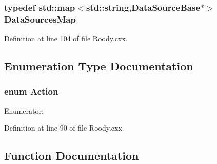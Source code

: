\subsubsection[{DataSourcesMap}]{\setlength{\rightskip}{0pt plus 5cm}typedef std::map$<$std::string,DataSourceBase$\ast$$>$ {\bf DataSourcesMap}}\label{Roody_8cxx_a983be03604153205d83c4c28d8b2891e}


Definition at line 104 of file Roody.cxx.

\subsection{Enumeration Type Documentation}
\subsubsection[{Action}]{\setlength{\rightskip}{0pt plus 5cm}enum {\bf Action}}\label{Roody_8cxx_a8bb1ef53467e4f61410d12822d922498}
\begin{Desc}
\item[Enumerator: ]\par
\begin{description}
\item[{\em 
A\_\-ITEM\label{Roody_8cxx_a8bb1ef53467e4f61410d12822d922498ad4f8562da213e20133393364451c5b44}
}]\item[{\em 
A\_\-FOLDER\label{Roody_8cxx_a8bb1ef53467e4f61410d12822d922498a506cbac1e552dac39438f1257f0a48db}
}]\item[{\em 
A\_\-SOURCE\label{Roody_8cxx_a8bb1ef53467e4f61410d12822d922498a2c9efb4d17b30eba2326dab6d8763d1a}
}]\item[{\em 
A\_\-GROUP\label{Roody_8cxx_a8bb1ef53467e4f61410d12822d922498a6d4bfa6b698453562f3ea0888b3362ad}
}]\end{description}
\end{Desc}



Definition at line 90 of file Roody.cxx.

\subsection{Function Documentation}
